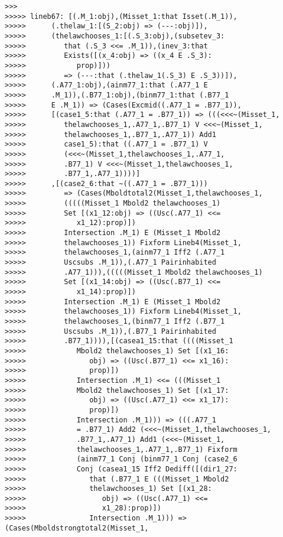 \documentclass[12pt]{article}
\begin{document}
\begin{verbatim}
>>>
>>>>> lineb67: [(.M_1:obj),(Misset_1:that Isset(.M_1)),
>>>>>      (.thelaw_1:[(S_2:obj) => (---:obj)]),
>>>>>      (thelawchooses_1:[(.S_3:obj),(subsetev_3:
>>>>>         that (.S_3 <<= .M_1)),(inev_3:that
>>>>>         Exists([(x_4:obj) => ((x_4 E .S_3):
>>>>>            prop)]))
>>>>>         => (---:that (.thelaw_1(.S_3) E .S_3))]),
>>>>>      (.A77_1:obj),(ainm77_1:that (.A77_1 E
>>>>>      .M_1)),(.B77_1:obj),(binm77_1:that (.B77_1
>>>>>      E .M_1)) => (Cases(Excmid((.A77_1 = .B77_1)),
>>>>>      [(case1_5:that (.A77_1 = .B77_1)) => (((<<<~(Misset_1,
>>>>>         thelawchooses_1,.A77_1,.B77_1) V <<<~(Misset_1,
>>>>>         thelawchooses_1,.B77_1,.A77_1)) Add1
>>>>>         case1_5):that ((.A77_1 = .B77_1) V
>>>>>         (<<<~(Misset_1,thelawchooses_1,.A77_1,
>>>>>         .B77_1) V <<<~(Misset_1,thelawchooses_1,
>>>>>         .B77_1,.A77_1))))]
>>>>>      ,[(case2_6:that ~((.A77_1 = .B77_1)))
>>>>>         => (Cases(Mboldtotal2(Misset_1,thelawchooses_1,
>>>>>         (((((Misset_1 Mbold2 thelawchooses_1)
>>>>>         Set [(x1_12:obj) => ((Usc(.A77_1) <<=
>>>>>            x1_12):prop)])
>>>>>         Intersection .M_1) E (Misset_1 Mbold2
>>>>>         thelawchooses_1)) Fixform Lineb4(Misset_1,
>>>>>         thelawchooses_1,(ainm77_1 Iff2 (.A77_1
>>>>>         Uscsubs .M_1)),(.A77_1 Pairinhabited
>>>>>         .A77_1))),(((((Misset_1 Mbold2 thelawchooses_1)
>>>>>         Set [(x1_14:obj) => ((Usc(.B77_1) <<=
>>>>>            x1_14):prop)])
>>>>>         Intersection .M_1) E (Misset_1 Mbold2
>>>>>         thelawchooses_1)) Fixform Lineb4(Misset_1,
>>>>>         thelawchooses_1,(binm77_1 Iff2 (.B77_1
>>>>>         Uscsubs .M_1)),(.B77_1 Pairinhabited
>>>>>         .B77_1)))),[(casea1_15:that ((((Misset_1
>>>>>            Mbold2 thelawchooses_1) Set [(x1_16:
>>>>>               obj) => ((Usc(.B77_1) <<= x1_16):
>>>>>               prop)])
>>>>>            Intersection .M_1) <<= (((Misset_1
>>>>>            Mbold2 thelawchooses_1) Set [(x1_17:
>>>>>               obj) => ((Usc(.A77_1) <<= x1_17):
>>>>>               prop)])
>>>>>            Intersection .M_1))) => (((.A77_1
>>>>>            = .B77_1) Add2 (<<<~(Misset_1,thelawchooses_1,
>>>>>            .B77_1,.A77_1) Add1 (<<<~(Misset_1,
>>>>>            thelawchooses_1,.A77_1,.B77_1) Fixform
>>>>>            (ainm77_1 Conj (binm77_1 Conj (case2_6
>>>>>            Conj (casea1_15 Iff2 Dediff([(dir1_27:
>>>>>               that (.B77_1 E (((Misset_1 Mbold2
>>>>>               thelawchooses_1) Set [(x1_28:
>>>>>                  obj) => ((Usc(.A77_1) <<=
>>>>>                  x1_28):prop)])
>>>>>               Intersection .M_1))) => (Cases(Mboldstrongtotal2(Misset_1,

\end{verbatim}
\end{document}

